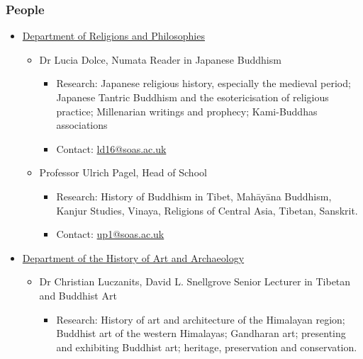 \documentclass[11pt]{article}
\begin{document}
\subsubsection*{People}
\label{sec:org34fb729}
\begin{itemize}
\item \href{https://www.soas.ac.uk/about/schools-departments-and-sections/department-religions-and-philosophies}{Department of Religions and Philosophies}
\label{sec:org00eb7b0}
\begin{itemize}
\item Dr Lucia Dolce, Numata Reader in Japanese Buddhism
\label{sec:org9cd697a}
\begin{itemize}
\item Research: Japanese religious history, especially the medieval period; Japanese Tantric Buddhism and the esotericisation of religious practice; Millenarian writings and prophecy; Kami-Buddhas associations\\
\item Contact: \href{mailto:ld16@soas.ac.uk}{ld16@soas.ac.uk}\\
\end{itemize}
\item Professor Ulrich Pagel, Head of School
\label{sec:org6b8274a}
\begin{itemize}
\item Research: History of Buddhism in Tibet, Mahāyāna Buddhism, Kanjur Studies, Vinaya, Religions of Central Asia, Tibetan, Sanskrit.\\
\item Contact: \href{mailto:up1@soas.ac.uk}{up1@soas.ac.uk}\\
\end{itemize}
\end{itemize}
\item \href{https://www.soas.ac.uk/about/schools-departments-and-sections/department-history-art-and-archaeology}{Department of the History of Art and Archaeology}
\label{sec:orgf8b455c}
\begin{itemize}
\item Dr Christian Luczanits, David L. Snellgrove Senior Lecturer in Tibetan and Buddhist Art
\label{sec:orga242a6f}
\begin{itemize}
\item Research: History of art and architecture of the Himalayan region; Buddhist art of the western Himalayas; Gandharan art; presenting and exhibiting Buddhist art; heritage, preservation and conservation.\\

\end{itemize}
\end{itemize}
\end{itemize}
\end{document}
